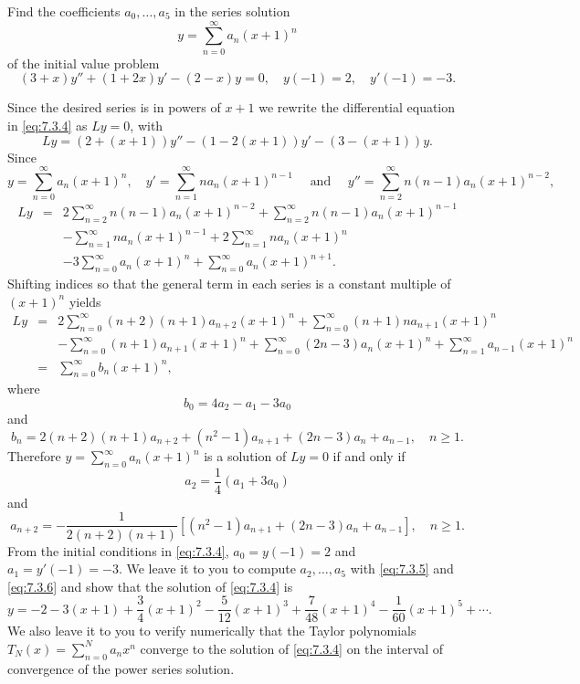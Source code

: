 \documentclass{ximera}
\begin{document}
\begin{example}\label{example:7.3.2}
Find  the coefficients $a_0, \dots, a_5$ in the series
solution
$$
y=\sum^\infty_{n=0} a_n(x+1)^n
$$
 of the initial value problem
\begin{equation} \label{eq:7.3.4}
(3+x)y''+(1+2x)y'-(2-x)y=0,\quad y(-1)=2,\quad y'(-1)=-3.
\end{equation}
\begin{explanation}
Since the desired series is in powers of $x+1$ we rewrite
the differential equation in \eqref{eq:7.3.4} as $Ly=0$, with
$$
Ly=\left(2+(x+1)\right)y''-\left(1-2(x+1)\right)y'-\left(3-(x+1)\right)y.
$$
Since
$$
y=\sum^\infty_{n=0} a_n(x+1)^n,\quad y'=\sum^\infty_{n=1} n
a_n(x+1)^{n-1}\quad\mbox{ and }\quad
y''=\sum^\infty_{n=2}n(n-1)a_n(x+1)^{n-2},
$$
\begin{eqnarray*}
Ly&=&2\sum^\infty_{n=2}n(n-1)a_n(x+1)^{n-2}+\sum^\infty_{n=2}n(n-1)a_n(x+1)^{n-1}
\\&&-\sum^\infty_{n=1}na_n(x+1)^{n-1}+2\sum^\infty_{n=1}na_n(x+1)^n\\
&&-3\sum^\infty_{n=0}a_n(x+1)^n+\sum_{n=0}^\infty a_n(x+1)^{n+1}.
\end{eqnarray*}
Shifting indices so that  the general term in each
series is a constant multiple of $(x+1)^n$ yields
\begin{eqnarray*}
Ly&=&2\sum^\infty_{n=0}(n+2)(n+1)a_{n+2}(x+1)^n+\sum^\infty_{n=0}(n+1)na_{n+1}
(x+1)^n\\&&-\sum^\infty_{n=0}(n+1)a_{n+1}(x+1)^n
+\sum^\infty_{n=0}(2n-3)a_n(x+1)^n+\sum^\infty_{n=1}a_{n-1}(x+1)^n\\
&=&\sum^\infty_{n=0}b_n(x+1)^n,
\end{eqnarray*}
where
$$
b_0=4a_2-a_1-3a_0
$$
and
$$
b_n=2(n+2)(n+1)a_{n+2}+(n^2-1)a_{n+1}+(2n-3)a_n+a_{n-1},\quad n\geq1.
$$
Therefore $y=\sum^\infty_{n=0}a_n(x+1)^n$ is a solution of $Ly=0$
if and only if
\begin{equation} \label{eq:7.3.5}
a_2=\frac{1}{4}(a_1+3a_0)
\end{equation}
and
\begin{equation} \label{eq:7.3.6}
a_{n+2}=-\frac{1}{2(n+2)(n+1)}\left[(n^2-1)a_{n+1}+(2n-3)a_n+a_{n-1}\right],
\quad n\geq1.
\end{equation}
From the initial conditions in \eqref{eq:7.3.4}, $a_0=y(-1)=2$ and
$a_1=y'(-1)=-3$. We leave it to you to  compute $a_2, \dots, a_5$
with  \eqref{eq:7.3.5} and \eqref{eq:7.3.6} and show that
the solution of \eqref{eq:7.3.4} is
$$
y=-2-3(x+1)+\frac{3}{4}(x+1)^2-\frac{5}{12}(x+1)^3+\frac{7}{48}(x+1)^4
-\frac{1}{60}(x+1)^5+\cdots.
$$
We also leave it to you %
to verify numerically
that the Taylor polynomials $T_N(x)=\sum_{n=0}^Na_nx^n$ converge to
the solution of \eqref{eq:7.3.4}  on the interval of
convergence of the power series solution.
\end{explanation}
\end{example}
\end{document}
